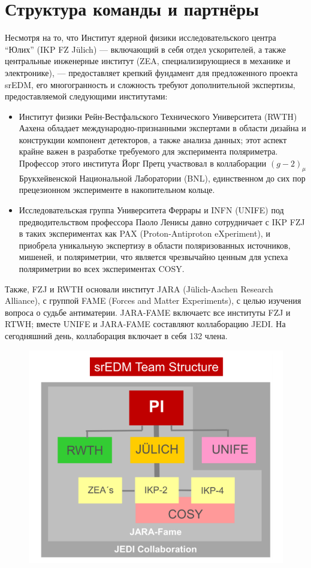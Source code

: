 \documentclass{extarticle}
\begin{document}
\section{Структура команды и партнёры}
Несмотря на то, что Институт ядерной физики исследовательского центра ``Юлих'' (IKP FZ J\"ulich) --- включающий в себя отдел ускорителей, а также центральные инженерные институт (ZEA, специализирующиеся в механике и электронике), --- предоставляет крепкий фундамент для предложенного проекта srEDM, его многогранность и сложность требуют  дополнительной экспертизы, предоставляемой следующими институтами:
\begin{itemize}
	\item Институт физики Рейн-Вестфальского Технического Университета (RWTH) Аахена обладает международно-признанными экспертами в области дизайна и конструкции компонент детекторов, а также анализа данных; этот аспект крайне важен в разработке требуемого для эксперимента поляриметра. Профессор этого института Йорг Претц участвовал в коллаборации $(g-2)_{\mu}$ Брукхейвенской Национальной Лаборатории (BNL), единственном до сих пор прецезионном эксперименте в накопительном кольце.
	\item Исследовательская группа Университета Феррары и INFN (UNIFE) под предводительством профессора Паоло Ленисы давно сотрудничает с IKP FZJ в таких экспериментах как PAX (Proton-Antiproton eXperiment), и приобрела уникальную экспертизу в области поляризованных источников, мишеней, и поляриметрии, что является чрезвычайно ценным для успеха поляриметрии во всех экспериментах COSY.
\end{itemize}

Также, FZJ и RWTH основали институт JARA (J\"ulich-Aachen Research Alliance), с группой FAME (Forces and Matter Experiments), с целью изучения вопроса о судьбе антиматерии. JARA-FAME включаетс все институты FZJ и RTWH; вместе UNIFE и JARA-FAME составляют коллаборацию JEDI. На сегодняшний день, коллаборация включает в себя 132 члена.

\begin{figure}[h]
	\centering\includegraphics[scale=.7]{img/JEDI_architecture}
\end{figure}
\end{document}
